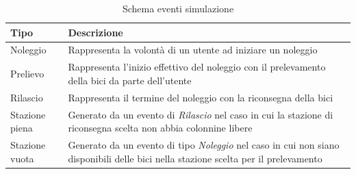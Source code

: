 \documentclass[a4paper, 12pt]{article}
\begin{document}
		\begin{table}
		\caption{Schema eventi simulazione}
		\label{eventtype}
		\begin{tabularx}{\textwidth}{| l | X |}
		 \hline
		 \textbf{Tipo} & \textbf{Descrizione} \\ [0.5ex] 
		 \hline
		 \hline
		Noleggio & Rappresenta la volontà di un utente ad iniziare un noleggio \\ 
		 \hline
		Prelievo & Rappresenta l'inizio effettivo del noleggio con il prelevamento della bici da parte dell'utente \\
		 \hline
		Rilascio &  Rappresenta il termine del noleggio con la riconsegna della bici \\
		 \hline
		Stazione piena &  Generato da un evento di \textit{Rilascio} nel caso in cui la stazione di riconsegna scelta non abbia colonnine libere \\
		 \hline
		Stazione vuota &  Generato da un evento di tipo \textit{Noleggio} nel caso in cui non siano disponibili delle bici nella stazione scelta per il prelevamento \\
		 \hline
		\end{tabularx}
		\end{table}
\end{document}
